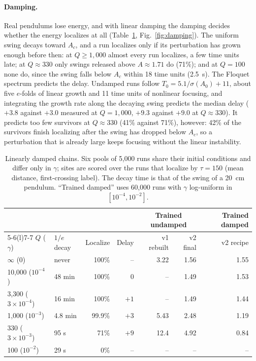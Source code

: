 \documentclass[11pt]{article}
\begin{document}
\paragraph{Damping.} Real pendulums lose energy, and with linear damping the damping decides whether the energy localizes at all (Table~\ref{tab:damping}, Fig.~\ref{fig:damping}). The uniform swing decays toward $A_c$, and a run localizes only if its perturbation has grown enough before then: at $Q\ge1{,}000$ almost every run localizes, a few time units late; at $Q\approx330$ only swings released above $A\approx1.71$ do (71\%); and at $Q=100$ none do, since the swing falls below $A_c$ within 18 time units (2.5~s). The Floquet spectrum predicts the delay. Undamped runs follow $T_0=5.1/\sigma(A_0)+11$, about five $e$-folds of linear growth and 11 time units of nonlinear focusing, and integrating the growth rate along the decaying swing predicts the median delay ($+3.8$ against $+3.0$ measured at $Q=1{,}000$, $+9.3$ against $+9.0$ at $Q\approx330$). It predicts too few survivors at $Q\approx330$ (41\% against 71\%), however: 42\% of the survivors finish localizing after the swing has dropped below $A_c$, so a perturbation that is already large keeps focusing without the linear instability.

\begin{table}[htbp]
  \centering
  \caption{Linearly damped chains. Six pools of 5,000 runs share their initial conditions and differ only in $\gamma$; sites are scored over the runs that localize by $\tau=150$ (mean distance, first-crossing label). The decay time is that of the swing of a 20~cm pendulum. ``Trained damped'' uses 60,000 runs with $\gamma$ log-uniform in $[10^{-4},10^{-2}]$.}
  \label{tab:damping}
  \small
  \begin{tabular}{@{}llrrrrr@{}}
    \toprule
    & & & & \multicolumn{2}{c}{Trained undamped} & Trained damped \\
    \cmidrule(lr){5-6}\cmidrule(l){7-7}
    $Q$ ($\gamma$) & $1/e$ decay & Localize & Delay & v1 rebuilt & v2 final & v2 recipe \\
    \midrule
    $\infty$ (0) & never & 100\% & -- & 3.22 & 1.56 & 1.55 \\
    10,000 ($10^{-4}$) & 48 min & 100\% & 0 & -- & 1.49 & 1.53 \\
    3,300 ($3\times10^{-4}$) & 16 min & 100\% & $+1$ & -- & 1.49 & 1.44 \\
    1,000 ($10^{-3}$) & 4.8 min & 99.9\% & $+3$ & 5.43 & 2.48 & 1.19 \\
    330 ($3\times10^{-3}$) & 95 s & 71\% & $+9$ & 12.4 & 4.92 & 0.84 \\
    100 ($10^{-2}$) & 29 s & 0\% & -- & -- & -- & -- \\
    \bottomrule
  \end{tabular}
\end{table}
\end{document}
